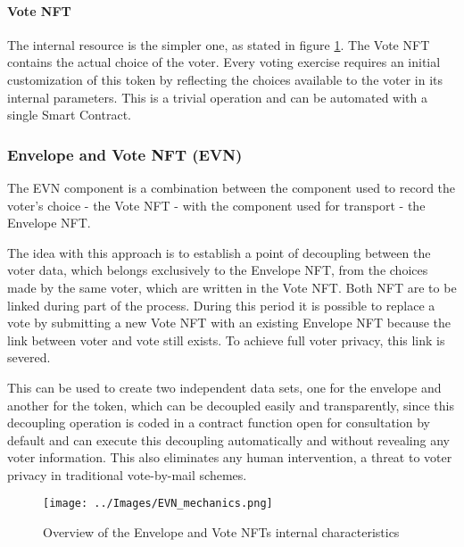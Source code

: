 \paragraph{Vote NFT}
The internal resource is the simpler one, as stated in figure \ref{fig:evn_mechanics}. The Vote NFT contains the actual choice of the voter. Every voting exercise requires an initial customization of this token by reflecting the choices available to the voter in its internal parameters. This is a trivial operation and can be automated with a single Smart Contract.

\subsubsection{Envelope and Vote NFT (EVN)}
The EVN component is a combination between the component used to record the voter's choice - the Vote NFT - with the component used for transport - the Envelope NFT.
\par
The idea with this approach is to establish a point of decoupling between the voter data, which belongs exclusively to the Envelope NFT, from the choices made by the same voter, which are written in the Vote NFT. Both NFT are to be linked during part of the process. During this period it is possible to replace a vote by submitting a new Vote NFT with an existing Envelope NFT because the link between voter and vote still exists. To achieve full voter privacy, this link is severed.
\par
This can be used to create two independent data sets, one for the envelope and another for the token, which can be decoupled easily and transparently, since this decoupling operation is coded in a contract function open for consultation by default and can execute this decoupling automatically and without revealing any voter information. This also eliminates any human intervention, a threat to voter privacy in traditional vote-by-mail schemes.

\begin{figure}[htp]
    \centering
    \texttt{[image: ../Images/EVN\_mechanics.png]}
    \caption{Overview of the Envelope and Vote NFTs internal characteristics}
    \label{fig:evn_mechanics}
\end{figure}


